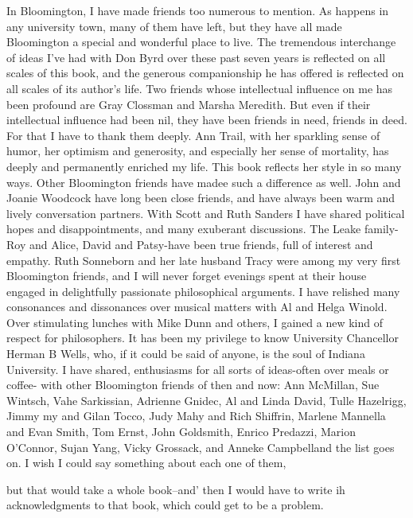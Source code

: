         In Bloomington, I have made friends too numerous to mention. As happens in
any university town, many of them have left, but they have all made Bloomington a
special and wonderful place to live.
        The tremendous interchange of ideas I've had with Don Byrd over these past
seven years is reflected on all scales of this book, and the generous companionship he
has offered is reflected on all scales of its author's life.
        Two friends whose intellectual influence on me has been profound are Gray
Clossman and Marsha Meredith. But even if their intellectual influence had been nil,
they have been friends in need, friends in deed. For that I have to thank them deeply.
        Ann Trail, with her sparkling sense of humor, her optimism and generosity,
and especially her sense of mortality, has deeply and permanently enriched my life.
This book reflects her style in so many ways.
        Other Bloomington friends have madee such a difference as well. John and
Joanie Woodcock have long been close friends, and have always been warm and
lively conversation partners. With Scott and Ruth Sanders I have shared political
hopes and disappointments, and many exuberant discussions. The Leake family-Roy
and Alice, David and Patsy-have been true friends, full of interest and empathy. Ruth
Sonneborn and her late husband Tracy were among my very first Bloomington
friends, and I will never forget evenings spent at their house engaged in delightfully
passionate philosophical arguments. I have relished many consonances and
dissonances over musical matters with Al and Helga Winold. Over stimulating
lunches with Mike Dunn and others, I gained a new kind of respect for philosophers.
It has been my privilege to know University Chancellor Herman B Wells, who, if it
could be said of anyone, is the soul of Indiana University.
        I have shared, enthusiasms for all sorts of ideas-often over meals or coffee-
with other Bloomington friends of then and now: Ann McMillan, Sue Wintsch, Vahe
Sarkissian, Adrienne Gnidec, Al and Linda David, Tulle Hazelrigg, Jimmy my and
Gilan Tocco, Judy Mahy and Rich Shiffrin, Marlene Mannella and Evan Smith, Tom
Ernst, John Goldsmith, Enrico Predazzi, Marion O'Connor, Sujan Yang, Vicky
Grossack, and Anneke Campbelland the list goes on. I wish I could say something
about each one of them,





but that would take a whole book--and' then I would have to write ih
acknowledgments to that book, which could get to be a problem.

